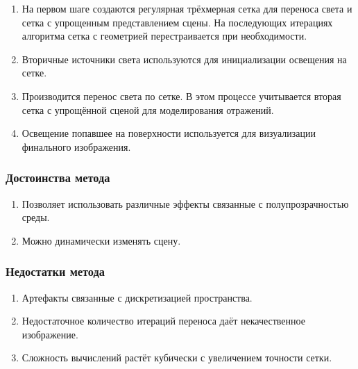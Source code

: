\documentclass[12pt,fleqn]{article}
\begin{document}
\begin{enumerate}

\item На первом шаге создаются регулярная трёхмерная сетка для переноса света и сетка с упрощенным представлением сцены. На последующих итерациях алгоритма сетка с геометрией перестраивается при необходимости.

\item Вторичные источники света используются для инициализации освещения на сетке.

\item Производится перенос света по сетке. В этом процессе учитывается вторая сетка с упрощённой сценой для моделирования отражений.

\item Освещение попавшее на поверхности используется для визуализации финального изображения.

\end{enumerate}

\subsubsection{Достоинства метода}

\begin{enumerate}

\item Позволяет использовать различные эффекты связанные с полупрозрачностью среды.

\item Можно динамически изменять сцену.

\end{enumerate}

\subsubsection{Недостатки метода}

\begin{enumerate}

\item Артефакты связанные с дискретизацией пространства.

\item Недостаточное количество итераций переноса даёт некачественное изображение.

\item Сложность вычислений растёт кубически с увеличением точности сетки.

\end{enumerate}
\end{document}
